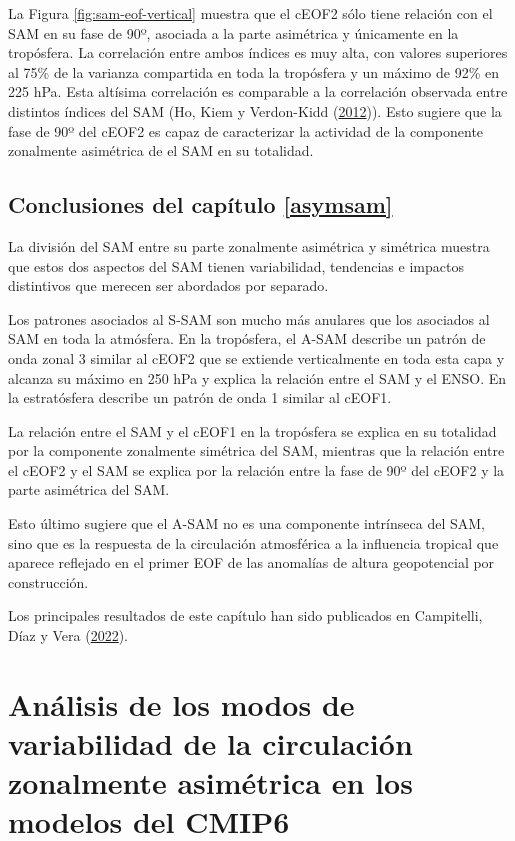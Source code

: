 \documentclass[12pt,oneside,a4paper]{reedthesis}
\begin{document}
La Figura \ref{fig:sam-eof-vertical} muestra que el cEOF2 sólo tiene relación con el SAM en su fase de 90º, asociada a la parte asimétrica y únicamente en la tropósfera.
La correlación entre ambos índices es muy alta, con valores superiores al 75\% de la varianza compartida en toda la tropósfera y un máximo de 92\% en 225 hPa.
Esta altísima correlación es comparable a la correlación observada entre distintos índices del SAM (Ho, Kiem y Verdon-Kidd (\protect\hyperlink{ref-ho2012}{2012})).
Esto sugiere que la fase de 90º del cEOF2 es capaz de caracterizar la actividad de la componente zonalmente asimétrica de el SAM en su totalidad.

\hypertarget{conclusiones-del-capuxedtulo-refasymsam}{%
\section{Conclusiones del capítulo \ref{asymsam}}\label{conclusiones-del-capuxedtulo-refasymsam}}

La división del SAM entre su parte zonalmente asimétrica y simétrica muestra que estos dos aspectos del SAM tienen variabilidad, tendencias e impactos distintivos que merecen ser abordados por separado.

Los patrones asociados al S-SAM son mucho más anulares que los asociados al SAM en toda la atmósfera.
En la tropósfera, el A-SAM describe un patrón de onda zonal 3 similar al cEOF2 que se extiende verticalmente en toda esta capa y alcanza su máximo en 250 hPa y explica la relación entre el SAM y el ENSO.
En la estratósfera describe un patrón de onda 1 similar al cEOF1.

La relación entre el SAM y el cEOF1 en la tropósfera se explica en su totalidad por la componente zonalmente simétrica del SAM, mientras que la relación entre el cEOF2 y el SAM se explica por la relación entre la fase de 90º del cEOF2 y la parte asimétrica del SAM.

Esto último sugiere que el A-SAM no es una componente intrínseca del SAM, sino que es la respuesta de la circulación atmosférica a la influencia tropical que aparece reflejado en el primer EOF de las anomalías de altura geopotencial por construcción.

Los principales resultados de este capítulo han sido publicados en Campitelli, Díaz y Vera (\protect\hyperlink{ref-campitelli2022}{2022}).

\hypertarget{cmip6}{%
\chapter{Análisis de los modos de variabilidad de la circulación zonalmente asimétrica en los modelos del CMIP6}\label{cmip6}}
\end{document}
